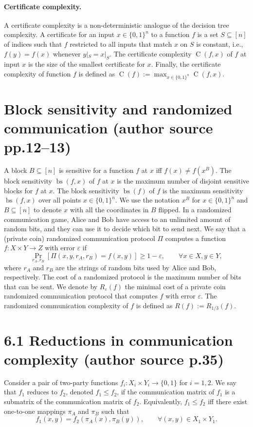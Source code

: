 \documentclass[10pt,a4paper]{article}
\newcommand{\bits}{\{0,1\}}
\newcommand{\CC}{\operatorname C}
\begin{document}
\paragraph{Certificate complexity.} A certificate complexity is a non-deterministic analogue of the decision tree complexity. A certificate for an input $x\in\bits^n$ to a function $f$ is a set $S\subseteq[n]$ of indices such that $f$ restricted to all inputs that match $x$ on $S$ is constant, i.e., $f(y)=f(x)$ whenever $y|_S=x|_S$. The certificate complexity $\CC(f,x)$ of $f$ at input $x$ is the size of the smallest certificate for $x$. Finally, the certificate complexity of function $f$ is defined as $\CC(f):=\max_{x\in\bits^n}\CC(f,x)$.

\section*{Block sensitivity and randomized communication (author source pp.12--13)}
A block $B\subseteq[n]$ is sensitive for a function $f$ at $x$ iff $f(x)\ne f(x^B)$. The block sensitivity $\operatorname{bs}(f,x)$ of $f$ at $x$ is the maximum number of disjoint sensitive blocks for $f$ at $x$. The block sensitivity $\operatorname{bs}(f)$ of $f$ is the maximum sensitivity $\operatorname{bs}(f,x)$ over all points $x\in\bits^n$.
We use the notation $x^B$ for $x\in\bits^n$ and $B\subseteq[n]$ to denote $x$ with all the coordinates in $B$ flipped.
In a randomized communication game, Alice and Bob have access to an unlimited amount of random bits, and they can use it to decide which bit to send next. We say that a (private coin) randomized communication protocol $\Pi$ computes a function $f:X\times Y\to Z$ with error $\varepsilon$ if
\[\Pr_{r_A,r_B}[\Pi(x,y,r_A,r_B)=f(x,y)]\ge1-\varepsilon,\qquad\forall x\in X,y\in Y,\]
where $r_A$ and $r_B$ are the strings of random bits used by Alice and Bob, respectively. The cost of a randomized protocol is the maximum number of bits that can be sent. We denote by $R_\varepsilon(f)$ the minimal cost of a private coin randomized communication protocol that computes $f$ with error $\varepsilon$. The randomized communication complexity of $f$ is defined as $R(f):=R_{1/3}(f)$.
\section*{6.1 Reductions in communication complexity (author source p.35)}
Consider a pair of two-party functions $f_i:X_i\times Y_i\to\bits$ for $i=1,2$. We say that $f_1$ reduces to $f_2$, denoted $f_1\le f_2$, if the communication matrix of $f_1$ is a submatrix of the communication matrix of $f_2$. Equivalently, $f_1\le f_2$ iff there exist one-to-one mappings $\pi_A$ and $\pi_B$ such that
\[f_1(x,y)=f_2(\pi_A(x),\pi_B(y)),\qquad\forall(x,y)\in X_1\times Y_1.\]
\end{document}
